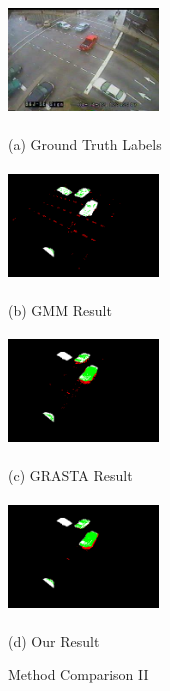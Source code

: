 \documentclass{article}
\begin{document}
\begin{figure}[t]

\begin{minipage}[b]{0.48\linewidth}
  \centering
  \centerline{\includegraphics[width=4cm, height=3cm]{Imgs/0412041242.jpg}}
  \centerline{(a) Ground Truth Labels}\medskip
\end{minipage}
\begin{minipage}[b]{0.48\linewidth}
  \centering
  \centerline{\includegraphics[width=4cm, height=3cm]{Imgs/0412041242_gmm_rwg.png}}
  \centerline{(b) GMM Result}\medskip
\end{minipage}

\begin{minipage}[b]{0.48\linewidth}
  \centering
  \centerline{\includegraphics[width=4cm, height =3cm]{Imgs/0412041242_grasta_rwg.png}}
  \centerline{(c) GRASTA Result}\medskip
\end{minipage}
\begin{minipage}[b]{0.48\linewidth}
  \centering
  \centerline{\includegraphics[width=4cm, height = 3cm]{Imgs/0412041242_rpca_rwg.png}}
  \centerline{(d) Our Result}\medskip
\end{minipage}

\caption{Method Comparison II}
\label{fig:methodComp2}
%
\end{figure}
\end{document}
